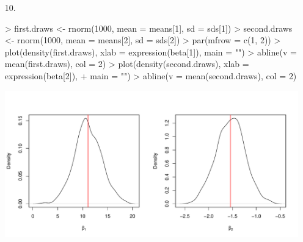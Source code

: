 \documentclass[handout]{beamer}
\newcommand{\red}{\color{red}}
\begin{document}
\begin{frame}[fragile]
\begin{enumerate}
\red
\footnotesize
\item [10.]
\begin{center}
 
\begin{Schunk}
\begin{Sinput}
> first.draws <- rnorm(1000, mean = means[1], sd = sds[1])
> second.draws <- rnorm(1000, mean = means[2], sd = sds[2])
> par(mfrow = c(1, 2))
> plot(density(first.draws), xlab = expression(beta[1]), main = "")
> abline(v = mean(first.draws), col = 2)
> plot(density(second.draws), xlab = expression(beta[2]), 
+     main = "")
> abline(v = mean(second.draws), col = 2)
\end{Sinput}
\end{Schunk}
\includegraphics{rslides-plot7}
\end{center}
\end{enumerate}
\end{frame}
\end{document}
